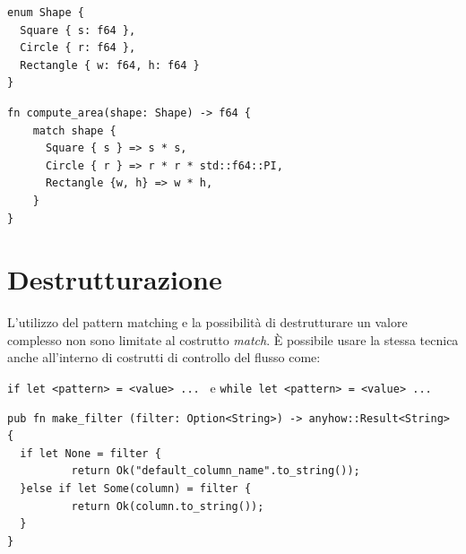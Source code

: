 \begin{center}
  \centering
  \begin{minipage}{\linewidth}
    \begin{minipage}{0.35\linewidth}

      \begin{verbatim}
enum Shape {
  Square { s: f64 },
  Circle { r: f64 },
  Rectangle { w: f64, h: f64 }
}
\end{verbatim}

    \end{minipage}%
    \hfill
    \begin{minipage}{\linewidth}
      \begin{minipage}{0.6\linewidth}

        \begin{verbatim}
fn compute_area(shape: Shape) -> f64 {
    match shape {
      Square { s } => s * s,
      Circle { r } => r * r * std::f64::PI,
      Rectangle {w, h} => w * h,
    }
}
\end{verbatim}
      \end{minipage}
    \end{minipage}
  \end{minipage}
\end{center}


\section{Destrutturazione}

L'utilizzo del pattern matching e la possibilità di destrutturare un valore complesso
non sono limitate al costrutto \textit{match}. È possibile usare la stessa tecnica
anche all'interno di costrutti di controllo del flusso come:

\begin{center}
  \centering
  \texttt{if let <pattern> = <value> ...  }
  e
  \texttt{while let <pattern> = <value> ...  }
\end{center}

\begin{verbatim}
pub fn make_filter (filter: Option<String>) -> anyhow::Result<String> {
  if let None = filter {
          return Ok("default_column_name".to_string());
  }else if let Some(column) = filter {
          return Ok(column.to_string());
  }
}
\end{verbatim}


